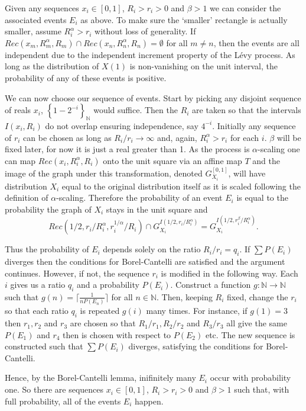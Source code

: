 \documentclass[12pt]{amsart}
\numberwithin{equation}{section}
\begin{document}
Given any sequences $x_i \in [0,1]$, $R_i > r_i > 0$ and $\beta > 1$ we can consider the associated events $E_i$ as above. To make sure the `smaller' rectangle is actually smaller, assume $R_i^{\alpha} > r_i$ without loss of generality. If $Rec(x_m,R_m^{\alpha}, R_m) \cap Rec(x_n,R_n^{\alpha},R_n) = \emptyset$ for all $m\neq n$, then the events are all independent due to the independent increment property of the L\'evy process. As long as the distribution of $X(1)$ is non-vanishing on the unit interval, the probability of any of these events is positive.

We can now choose our sequence of events. Start by picking any disjoint sequence of reals  $x_i$, $\left\{1-2^{-i} \right\}_{\mathbb{N}}$ would suffice. Then the $R_i$ are taken so that the intervals $I(x_i, R_i)$ do not overlap ensuring independence, say $4^{-i}$. Initially any sequence of $r_i$ can be chosen as long as $R_i/r_i \rightarrow \infty$ and, again, $R_i^{\alpha} > r_i$ for each $i$. $\beta$ will be fixed later, for now it is just a real greater than 1. As the process is $\alpha$-scaling one can map $Rec(x_i,R_i^{\alpha},R_i)$ onto the unit square via an affine map $T$ and the image of the graph under this transformation, denoted $G_{X_i}^{[0,1]}$, will have distribution $X_i$ equal to the original distribution itself as it is scaled following the definition of $\alpha$-scaling. Therefore the probability of an event $E_i$ is equal to the probability the graph of $X_i$ stays in the unit square and 
$$Rec(1/2,r_i/R_i^{\alpha} ,r_i^{1/\alpha}/R_i ) \cap G_{X_i}^{I(1/2, r_i/R_i^{\alpha})} = G_{X_i}^{I(1/2, r_i^{\beta}/R_i^{\alpha})}.$$

Thus the probability of $E_i$ depends solely on the ratio $R_i/r_i = q_i$. If $\sum P(E_i)$ diverges then the conditions for Borel-Cantelli are satisfied and the argument continues. However, if not, the sequence $r_i$ is modified in the following way. Each $i$ gives us a ratio $q_i$ and a probability $P(E_i)$. Construct a function $g \colon \mathbb{N} \rightarrow \mathbb{N}$ such that $g(n) = \lceil \frac{1}{nP(E_n)}\rceil$ for all $n\in \mathbb{N}$. Then, keeping $R_i$ fixed, change the $r_i$ so that each ratio $q_i$ is repeated $g(i)$ many times. For instance, if $g(1) = 3$ then $r_1,r_2$ and $r_3$ are chosen so that $R_1/r_1, R_2/r_2$ and $R_3/r_3$ all give the same $P(E_1)$ and $r_4$ then is chosen with respect to $P(E_2)$ etc. The new sequence is constructed such that $\sum P(E_i)$ diverges, satisfying the conditions for Borel-Cantelli.

Hence, by the Borel-Cantelli lemma, inifinitely many $E_i$ occur with probability one. So there are sequences $x_i \in [0,1]$, $R_i > r_i > 0$ and $\beta > 1$ such that, with full probability, all of the events $E_i$ happen. 
\end{document}
